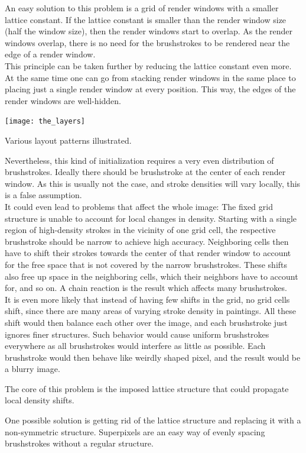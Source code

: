 An easy solution to this problem is a grid of render windows with a smaller lattice constant.
If the lattice constant is smaller than the render window size (\eg half the window size), then the render windows start to overlap.
As the render windows overlap, there is no need for the brushstrokes to be rendered near the edge of a render window.\\
This principle can be taken further by reducing the lattice constant even more.
At the same time one can go from stacking render windows in the same place to placing just a single render window at every position.
This way, the edges of the render windows are well-hidden.
\begin{marginfigure}
    \texttt{[image: the\_layers]}
    \caption{Various layout patterns illustrated.}
\end{marginfigure}

Nevertheless, this kind of initialization requires a very even distribution of brushstrokes.
Ideally there should be brushstroke at the center of each render window.
As this is usually not the case, and stroke densities will vary locally, this is a false assumption. \\
It could even lead to problems that affect the whole image:
The fixed grid structure is unable to account for local changes in density.
Starting with a single region of high-density strokes in the vicinity of one grid cell, the respective brushstroke should be narrow to achieve high accuracy.
Neighboring cells then have to shift their strokes towards the center of that render window to account for the free space that is not covered by the narrow brushstrokes.
These shifts also free up space in the neighboring cells, which their neighbors have to account for, and so on.
A chain reaction is the result which affects many brushstrokes. \\
It is even more likely that instead of having few shifts in the grid, no grid cells shift, since there are many areas of varying stroke density in paintings.
All these shift would then balance each other over the image, and each brushstroke just ignores finer structures.
Such behavior would cause uniform brushstrokes everywhere as all brushstrokes would interfere as little as possible.
Each brushstroke would then behave like weirdly shaped pixel, and the result would be a blurry image.

The core of this problem is the imposed lattice structure that could propagate local density shifts.

One possible solution is getting rid of the lattice structure and replacing it with a non-symmetric structure.
Superpixels are an easy way of evenly spacing brushstrokes without a regular structure.

